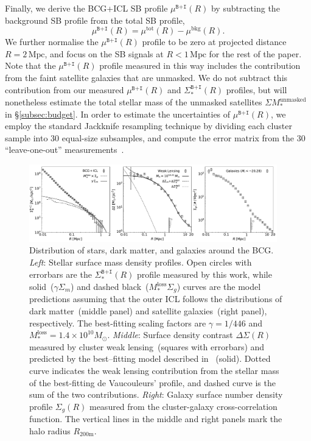 \documentclass[fleqn,usenatbib]{mnras}
\def\mrm{\mathrm}
\newcommand{\sigbi}{\Sigma_*^{\texttt{B+I}}}
\newcommand{\sigm}{\Sigma_m}
\newcommand{\sigg}{\Sigma_g}
\newcommand{\mubi}{\mu^{\texttt{B+I}}}
\newcommand{\mpc}{\mathrm{Mpc}}
\newcommand{\msol}{M_{\odot}}
\newcommand{\ds}{\Delta\Sigma}
\begin{document}
Finally, we derive the BCG+ICL SB profile $\mubi(R)$ by subtracting the
background SB profile from the total SB profile,
\begin{equation}
\mubi(R) = \mu^{\mathrm{tot}}(R) - \mu^{\mathrm{bkg}}(R).
\end{equation}
We further normalise the $\mubi(R)$ profile to be
zero at projected distance $R{=}2\,\mpc$, and focus on the SB signals at
$R{<}1\,\mpc$ for the rest of the paper. Note that the $\mubi(R)$ profile
measured in this way includes the contribution from the faint satellite
galaxies that are unmasked. We do not subtract this contribution from our
measured $\mubi(R)$ and $\sigbi(R)$ profiles, but will nonetheless estimate
the total stellar mass of the unmasked satellites $\Sigma
M_*^{\mathrm{unmasked}}$ in \S\ref{subsec:budget}. In order to estimate the
uncertainties of $\mubi(R)$, we employ the standard Jackknife resampling
technique by dividing each cluster sample into 30 equal-size subsamples,
and compute the error matrix from the 30 ``leave-one-out''
measurements~\citep{Efron1981}.

\begin{figure}
    \centering\includegraphics[width=0.96\textwidth]{fig/total_sample_SB_SM.pdf}
    \caption{Distribution of stars, dark matter, and galaxies around the
    BCG.  {\it Left}: Stellar surface mass density profiles. Open circles
    with errorbars are the $\sigbi(R)$ profile measured by this work, while
    solid~($\gamma\sigm$) and dashed black~($M_*^{\mathrm{loss}}\sigg$)
    curves are the model predictions assuming that the outer ICL follows
    the distributions of dark matter~(middle panel) and satellite
    galaxies~(right panel), respectively. The best-fitting scaling factors
    are $\gamma{=}1/446$ and
    $M_*^{\mathrm{loss}}{=}1.4{\times}10^{10}\msol$.  {\it Middle}: Surface
    density contrast $\ds(R)$ measured by cluster weak lensing~(squares
    with errorbars) and predicted by the best--fitting model described in
    ~(solid). Dotted curve indicates the weak lensing
    contribution from the stellar mass of the best-fitting de Vaucouleurs'
    profile, and dashed curve is the sum of the two contributions.  {\it
    Right}: Galaxy surface number density profile $\sigg(R)$ measured from
    the cluster-galaxy cross-correlation function. The vertical lines in
    the middle and right panels mark the halo radius $R_{200\mrm{m}}$.
    \label{fig:massprof3panel} }
\end{figure}
\end{document}
